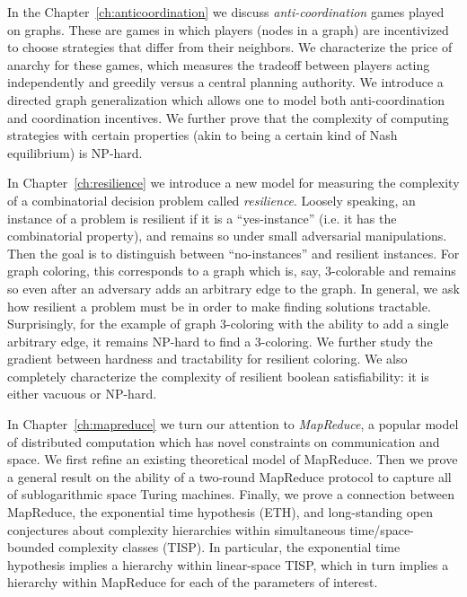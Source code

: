 In the Chapter~\ref{ch:anticoordination} we discuss \emph{anti-coordination}
games played on graphs. These are games in which players (nodes in a graph) are
incentivized to choose strategies that differ from their neighbors. We
characterize the price of anarchy for these games, which measures the tradeoff
between players acting independently and greedily versus a central planning
authority. We introduce a directed graph generalization which allows one to
model both anti-coordination and coordination incentives. We further prove that
the complexity of computing strategies with certain properties (akin to being a
certain kind of Nash equilibrium) is NP-hard.

In Chapter~\ref{ch:resilience} we introduce a new model for measuring the
complexity of a combinatorial decision problem called \emph{resilience}.
Loosely speaking, an instance of a problem is resilient if it is a
``yes-instance'' (i.e. it has the combinatorial property),  and remains so
under small adversarial manipulations. Then the goal is to distinguish between
``no-instances'' and resilient instances. For graph coloring, this corresponds
to a graph which is, say, 3-colorable and remains so even after an adversary
adds an arbitrary edge to the graph. In general, we ask how resilient a problem
must be in order to make finding solutions tractable.  Surprisingly, for the
example of graph 3-coloring with the ability to add a single arbitrary edge, it
remains NP-hard to find a 3-coloring. We further study the gradient between
hardness and tractability for resilient coloring. We also completely
characterize the complexity of resilient boolean satisfiability: it is either
vacuous or NP-hard.

In Chapter~\ref{ch:mapreduce} we turn our attention to \emph{MapReduce}, a
popular model of distributed computation which has novel constraints on
communication and space. We first refine an existing theoretical model of
MapReduce. Then we prove a general result on the ability of a two-round
MapReduce protocol to capture all of sublogarithmic space Turing machines.
Finally, we prove a connection between MapReduce, the exponential time
hypothesis (ETH), and long-standing open conjectures about complexity
hierarchies within simultaneous time/space-bounded complexity classes (TISP).
In particular, the exponential time hypothesis implies a hierarchy within
linear-space TISP, which in turn implies a hierarchy within MapReduce for each
of the parameters of interest.

